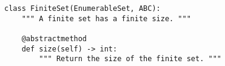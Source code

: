 \par\begin{minipage}{60ex}
\begin{verbatim}
class FiniteSet(EnumerableSet, ABC):
    """ A finite set has a finite size. """

    @abstractmethod
    def size(self) -> int:
        """ Return the size of the finite set. """
\end{verbatim}
\end{minipage}\par
